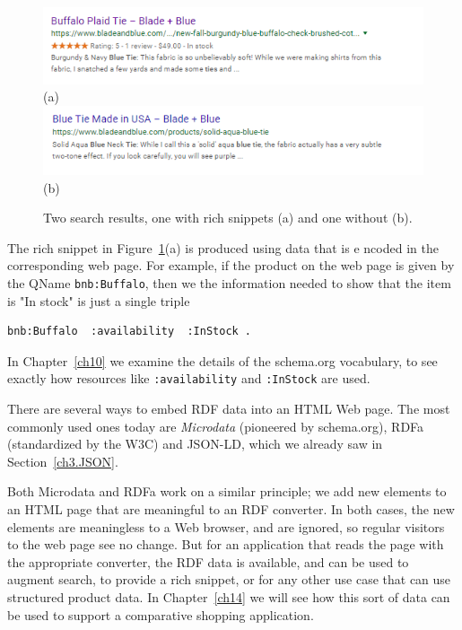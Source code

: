 \begin{figure}
    \centering
    \includegraphics{SWWOv3/media/ch4/WithRichSnippet.png}
    (a)
    \includegraphics{SWWOv3/media/ch4/WithoutRichSnippet.png}
    (b)
    \caption{Two search results, one with rich snippets (a) and one without (b). }
    \label{fig:ch4.RS}
\end{figure}

The rich snippet in Figure~\ref{fig:ch4.RS}(a) is produced using data that is e
ncoded in the corresponding 
web page.  For example, if the product on the web page is given by the QName \texttt{bnb:Buffalo},  
then we the information needed to show that the item is "In stock" is just 
a single triple

\begin{lstlisting}
bnb:Buffalo  :availability  :InStock .
\end{lstlisting}


In Chapter~\ref{ch10} we examine the details of the schema.org vocabulary, to 
see exactly how  resources like \texttt{:availability} and \texttt{:InStock} are used. 

There are several ways to embed RDF data into an HTML Web page.  The most commonly used ones
today are \emph{Microdata} (pioneered by schema.org), RDFa (standardized by the W3C)
and JSON-LD, which we already saw in Section~\ref{ch3.JSON}. 

Both Microdata and RDFa work on a similar principle; we add new elements to an 
HTML page that are meaningful to an RDF converter.  In both cases, the new elements
are meaningless to a Web browser, and are ignored, so regular visitors to the
web page see no change.  But for an application that reads the page with the appropriate
converter, the RDF data is available, and can be used to augment search, to provide
a rich snippet, or for any other use case that can use structured product data.  In 
Chapter~\ref{ch14} we will see how this sort of data can be used to support a comparative
shopping application. 

